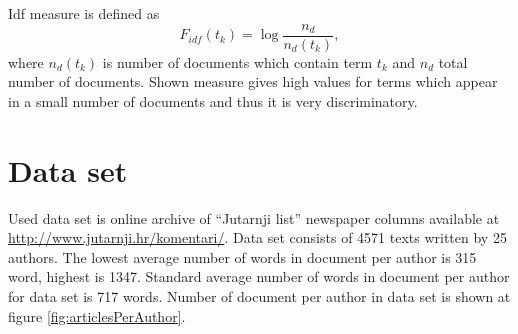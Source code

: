 \documentclass[11pt,english]{article}
\begin{document}
\begin{multicols}{2}
Idf measure is defined as
\begin{equation}
F_{idf}(t_k) = \log \frac{n_d}{n_d(t_k)},
\label{equ:idf}
\end{equation}
where $n_d(t_k)$ is number of documents which contain term $t_k$ and $n_d$
total number of documents. Shown measure gives high values for terms which
appear in a small number of documents and thus it is very discriminatory.


\section{Data set}
\label{sec:podatci}
Used data set is online archive of ``Jutarnji list'' newspaper columns
available at \url{http://www.jutarnji.hr/komentari/}. Data set consists of
4571 texts written by 25 authors. The lowest average number of words in
document per author is 315 word, highest is 1347. Standard average number
of words in document per author for data set is 717 words. Number of document
per author in data set is shown at figure \ref{fig:articlesPerAuthor}.



\end{multicols}
\end{document}
